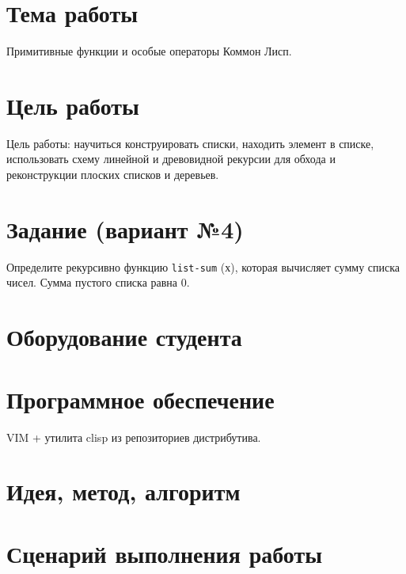 \documentclass[12pt]{article}
\begin{document}

\section{Тема работы}
Примитивные функции и особые операторы Коммон Лисп.

\section{Цель работы}
Цель работы: научиться конструировать списки, находить элемент в списке,
использовать схему линейной и древовидной рекурсии для обхода и реконструкции
плоских списков и деревьев.

\section{Задание (вариант №4)}
\noindent
Определите рекурсивно функцию {\tt list-sum} (х), которая вычисляет сумму
списка чисел.
Сумма пустого списка равна 0.

\section{Оборудование студента}
\mypc

\section{Программное обеспечение}
VIM + утилита clisp из репозиториев дистрибутива.

\section{Идея, метод, алгоритм}


\section{Сценарий выполнения работы}
\end{document}
